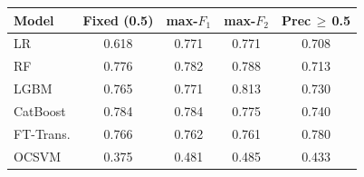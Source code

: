 \begin{tabular}{l c c c c}
\toprule
Model & Fixed (0.5) & max-$F_1$ & max-$F_2$ & Prec\,$\geq$\,0.5 \\
\midrule
LR         & 0.618 & 0.771 & 0.771 & 0.708 \\
RF         & 0.776 & 0.782 & 0.788 & 0.713 \\
LGBM       & 0.765 & 0.771 & 0.813 & 0.730 \\
CatBoost   & 0.784 & 0.784 & 0.775 & 0.740 \\
FT-Trans.  & 0.766 & 0.762 & 0.761 & 0.780 \\
OCSVM      & 0.375 & 0.481 & 0.485 & 0.433 \\
\bottomrule
\end{tabular}
